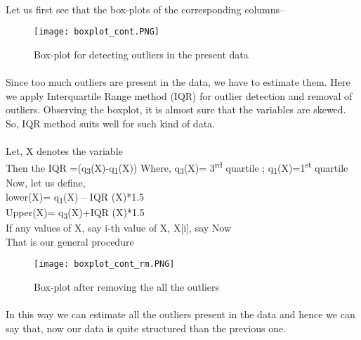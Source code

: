 \documentclass[A4paper,11pt]{report}
\begin{document}
	\paragraph{}Let us first see that the box-plots of the corresponding columns--
	\begin{figure}[h]
		\texttt{[image: boxplot\_cont.PNG]}
		\caption {Box-plot for detecting outliers in the present data}
	\end{figure}
	\paragraph{}Since too much outliers are present in the data, we have to estimate them. 
	Here we apply Interquartile Range method (IQR) for outlier detection and removal of outliers. Observing the boxplot, it is almost sure that the variables are skewed. So, IQR method suits well for such kind of data. 
	\paragraph{}Let, X denotes the variable \\
	Then the IQR =(q\textsubscript{3}(X)-q\textsubscript{1}(X))
	Where, q\textsubscript{3}(X)= 3\textsuperscript{rd} quartile ; q\textsubscript{1}(X)=1\textsuperscript{st} quartile
	\\Now, let us define, \\
	lower(X)= q\textsubscript{1}(X) – IQR (X)*1.5\\
	Upper(X)= q\textsubscript{3}(X)+IQR (X)*1.5\\
	If any values of X, say i-th value of X, X[i], say
	Now \\
	That is our general procedure\\
	\begin{figure}[h]
		\texttt{[image: boxplot\_cont\_rm.PNG]}
		\caption {Box-plot after removing the all the outliers}
	\end{figure}
	\paragraph{}In this way we can estimate all the outliers present in the data and hence we can say that, now our data is quite structured than the previous one.
\end{document}
